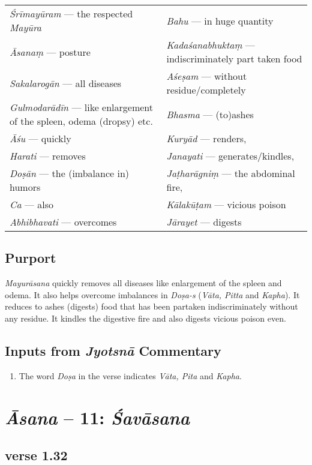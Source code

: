 \begin{longtable}{>{\noindent\raggedright}p{5cm}>{\noindent\raggedright}p{5cm}}
\textit{Śrīmayūram} --- the respected \textit{Mayūra}  & \textit{Bahu} --- in huge quantity\tabularnewline
\textit{Āsanaṃ} --- posture  & \textit{Kadaśanabhuktaṃ} --- indiscriminately part taken food\tabularnewline
\textit{Sakalarogān} --- all diseases   & \textit{Aśeṣam} --- without residue/completely\tabularnewline
\textit{Gulmodarādīn} --- like enlargement of the spleen, odema (dropsy) etc. &  \textit{Bhasma} --- (to)ashes  \tabularnewline
\textit{Āśu} --- quickly  & \textit{Kuryād} --- renders, \tabularnewline
\textit{Harati} --- removes & \textit{Janayati} --- generates/kindles,\tabularnewline
\textit{Doṣān} --- the (imbalance in) humors  & \textit{Jaṭharāgniṃ} --- the abdominal fire,\tabularnewline
\textit{Ca} --- also & \textit{Kālakūṭam} --- vicious poison \tabularnewline
\textit{Abhibhavati} --- overcomes   & \textit{Jārayet} --- digests
\end{longtable}

\subsection*{Purport}

\textit{Mayurāsana} quickly removes all diseases like enlargement of the spleen and odema. It also helps overcome imbalances in \textit{Doṣa-s} (\textit{Vāta, Pitta} and \textit{Kapha}). It reduces to ashes (digests) food that has been partaken indiscriminately without any residue. It kindles the digestive fire and also digests vicious poison even. 

\subsection*{Inputs from \textit{Jyotsnā} Commentary}

\begin{enumerate}
\item The word \textit{Doṣa} in the verse indicates \textit{Vāta, Pita} and \textit{Kapha}.
\end{enumerate}
\newpage

\section*{\textit{Āsana} -- 11: \textit{Śavāsana}}

\subsection*{verse 1.32}

